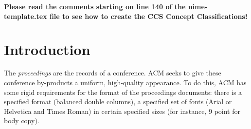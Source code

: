 \documentclass{nime-alternate}
\begin{document}
%
% 
%


\printccsdesc

\textbf{Please read the comments starting on line 140 of the nime-template.tex file to see how to create the CCS Concept Classifications!} %


\section{Introduction}
The \textit{proceedings} are the records of a conference.
ACM seeks to give these conference by-products a uniform,
high-quality appearance.  To do this, ACM has some rigid
requirements for the format of the proceedings documents: there
is a specified format (balanced  double columns), a specified
set of fonts (Arial or Helvetica and Times Roman) in
certain specified sizes (for instance, 9 point for body copy).
\end{document}
